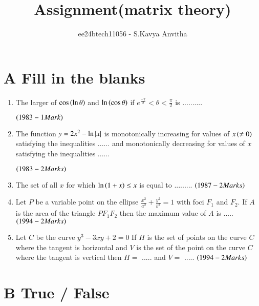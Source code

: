 \documentclass[journal,12pt,twocolumn]{IEEEtran}
\theoremstyle{remark}
\begin{document}

\vspace{3cm}

\title{Assignment(matrix theory)}
\author{ee24btech11056 - S.Kavya Anvitha}
\maketitle
\section{A Fill in the blanks}

\begin{enumerate}
\item The larger of $\cos \left(\ln \theta\right)$ and 
$\ln \left(\cos \theta\right)$ if  $e^{\frac{-\pi}{2}}< \theta< \frac{\pi}{2}$
is ..........

\hfill$\left(1983 - 1 Mark\right)$\\


\item The function $y=2x^{2}-\ln \left\vert x\right\vert$
is monotonically increasing for values of $x\left(\neq0\right)$ satisfying
the inequalities ...... and monotonically decreasing for values of $x$
satisfying the inequalities  ......

\hfill$\left(1983 - 2 Marks\right)$\\
	
\item The set of all $x$ for which $\ln \left(1+x\right) \leq x$
is equal to .........
\hfill$\left(1987 - 2 Marks\right)$\\

\item Let $P$ be a variable point on the ellipse
$\frac{x^2}{a^2}+\frac{y^2}{b^2} = 1$
with foci $F_1$ and $F_2$. If $A$ is the area of the triangle $PF_1F_2$ 
then the maximum value of $A$ is .....
\hfill$\left(1994 - 2 Marks\right)$\\

\item Let $C$ be the curve $y^3 - 3xy + 2 = 0$ If $H$ is the set 
of points on the curve $C$ where the tangent is horizontal and $V$ is
the set of the point on the curve $C$ where the tangent is vertical
then $H =$ ..... and $V =$ .....
\hfill$\left(1994 - 2 Marks\right)$\\
\end{enumerate}

\section{B True / False}
\end{document}
